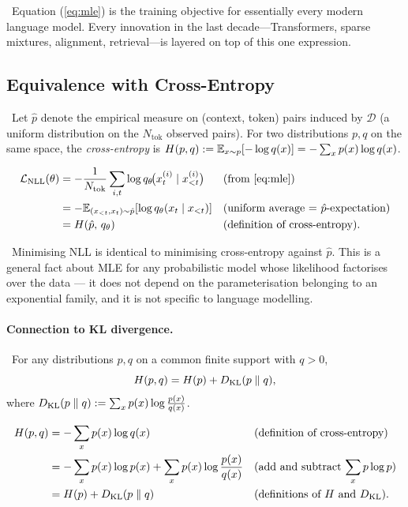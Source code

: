 \Cons\ Equation (\ref{eq:mle}) is the training objective for
essentially every modern language model. Every innovation in the last
decade---Transformers, sparse mixtures, alignment, retrieval---is
layered on top of this one expression.

\subsection{Equivalence with Cross-Entropy}

\Def\ Let $\hat p$ denote the empirical measure on (context, token)
pairs induced by $\mathcal{D}$ (a uniform distribution on the
$N_{\mathrm{tok}}$ observed pairs). For two distributions $p, q$ on the
same space, the \emph{cross-entropy} is
$H(p, q) := \mathbb{E}_{x \sim p}[-\log q(x)] = -\sum_x p(x) \log q(x)$.

\begin{derivation}
\begin{align}
\mathcal{L}_{\mathrm{NLL}}(\theta)
  &= -\frac{1}{N_{\mathrm{tok}}} \sum_{i,t}
       \log q_\theta\!\big(x^{(i)}_t \mid x^{(i)}_{<t}\big)
  && \text{(from \ref{eq:mle})} \\
  &= -\mathbb{E}_{(x_{<t}, x_t) \sim \hat p}\!\left[
       \log q_\theta(x_t \mid x_{<t}) \right]
  && \text{(uniform average $=$ $\hat p$-expectation)} \\
  &= H(\hat p,\, q_\theta)
  && \text{(definition of cross-entropy)}.
\label{eq:nll-ce}
\end{align}
\end{derivation}

\Ident\ Minimising NLL is identical to minimising cross-entropy against
$\hat p$. This is a general fact about MLE for any probabilistic
model whose likelihood factorises over the data --- it does not
depend on the parameterisation belonging to an exponential family,
and it is not specific to language modelling.

\paragraph{Connection to KL divergence.}
\Ident\ For any distributions $p, q$ on a common finite support with
$q > 0$,
\begin{equation}
H(p, q) = H(p) + D_{\mathrm{KL}}(p \parallel q),
\label{eq:ce-kl}
\end{equation}
where $D_{\mathrm{KL}}(p \parallel q) := \sum_x p(x) \log \frac{p(x)}{q(x)}$.

\begin{derivation}[: $H(p,q) = H(p) + \KL(p \parallel q)$]
\begin{align}
H(p, q)
  &= -\sum_x p(x) \log q(x)
  && \text{(definition of cross-entropy)} \\
  &= -\sum_x p(x) \log p(x)
       + \sum_x p(x) \log \frac{p(x)}{q(x)}
  && \text{(add and subtract $\sum_x p \log p$)} \\
  &= H(p) + D_{\mathrm{KL}}(p \parallel q)
  && \text{(definitions of $H$ and $D_{\mathrm{KL}}$)}.
\end{align}
\end{derivation}

